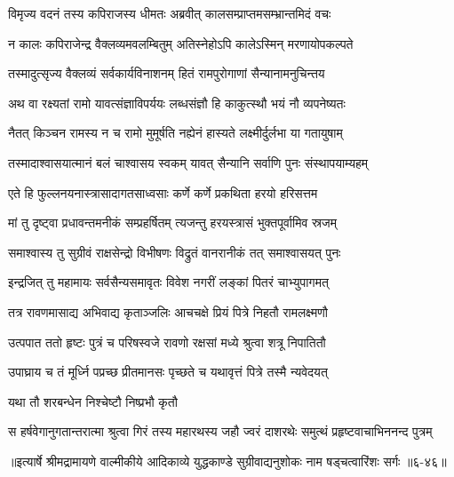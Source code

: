 \twolineshloka
{विमृज्य वदनं तस्य कपिराजस्य धीमतः}
{अब्रवीत् कालसम्प्राप्तमसम्भ्रान्तमिदं वचः} %

\twolineshloka
{न कालः कपिराजेन्द्र वैक्लव्यमवलम्बितुम्}
{अतिस्नेहोऽपि कालेऽस्मिन् मरणायोपकल्पते} %

\twolineshloka
{तस्मादुत्सृज्य वैक्लव्यं सर्वकार्यविनाशनम्}
{हितं रामपुरोगाणां सैन्यानामनुचिन्तय} %

\twolineshloka
{अथ वा रक्ष्यतां रामो यावत्संज्ञाविपर्ययः}
{लब्धसंज्ञौ हि काकुत्स्थौ भयं नौ व्यपनेष्यतः} %

\twolineshloka
{नैतत् किञ्चन रामस्य न च रामो मुमूर्षति}
{नह्येनं हास्यते लक्ष्मीर्दुर्लभा या गतायुषाम्} %

\twolineshloka
{तस्मादाश्वासयात्मानं बलं चाश्वासय स्वकम्}
{यावत् सैन्यानि सर्वाणि पुनः संस्थापयाम्यहम्} %

\twolineshloka
{एते हि फुल्लनयनास्त्रासादागतसाध्वसाः}
{कर्णे कर्णे प्रकथिता हरयो हरिसत्तम} %

\twolineshloka
{मां तु दृष्ट्वा प्रधावन्तमनीकं सम्प्रहर्षितम्}
{त्यजन्तु हरयस्त्रासं भुक्तपूर्वामिव स्रजम्} %

\twolineshloka
{समाश्वास्य तु सुग्रीवं राक्षसेन्द्रो विभीषणः}
{विद्रुतं वानरानीकं तत् समाश्वासयत् पुनः} %

\twolineshloka
{इन्द्रजित् तु महामायः सर्वसैन्यसमावृतः}
{विवेश नगरीं लङ्कां पितरं चाभ्युपागमत्} %

\twolineshloka
{तत्र रावणमासाद्य अभिवाद्य कृताञ्जलिः}
{आचचक्षे प्रियं पित्रे निहतौ रामलक्ष्मणौ} %

\twolineshloka
{उत्पपात ततो हृष्टः पुत्रं च परिषस्वजे}
{रावणो रक्षसां मध्ये श्रुत्वा शत्रू निपातितौ} %

\twolineshloka
{उपाघ्राय च तं मूर्ध्नि पप्रच्छ प्रीतमानसः}
{पृच्छते च यथावृत्तं पित्रे तस्मै न्यवेदयत्} %

\onelineshloka
{यथा तौ शरबन्धेन निश्चेष्टौ निष्प्रभौ कृतौ} %

\twolineshloka
{स हर्षवेगानुगतान्तरात्मा श्रुत्वा गिरं तस्य महारथस्य}
{जहौ ज्वरं दाशरथेः समुत्थं प्रहृष्टवाचाभिननन्द पुत्रम्} %


॥इत्यार्षे श्रीमद्रामायणे वाल्मीकीये आदिकाव्ये युद्धकाण्डे सुग्रीवाद्यनुशोकः नाम षड्चत्वारिंशः सर्गः ॥६-४६॥
